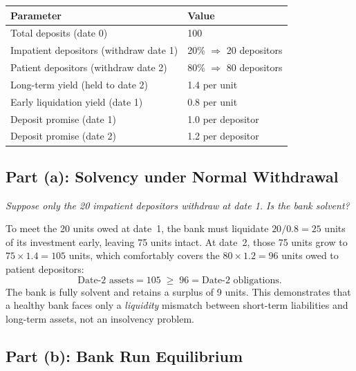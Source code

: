 \documentclass[a4paper]{article}
\begin{document}
\begin{center}
\begin{tabular}{ll}
\toprule
\textbf{Parameter} & \textbf{Value} \\
\midrule
Total deposits (date 0)              & 100 \\
Impatient depositors (withdraw date 1) & 20\% $\Rightarrow$ 20 depositors \\
Patient depositors (withdraw date 2)   & 80\% $\Rightarrow$ 80 depositors \\
Long-term yield (held to date 2)       & 1.4 per unit \\
Early liquidation yield (date 1)       & 0.8 per unit \\
Deposit promise (date 1)               & 1.0 per depositor \\
Deposit promise (date 2)               & 1.2 per depositor \\
\bottomrule
\end{tabular}
\end{center}

\subsection{Part (a): Solvency under Normal Withdrawal}

\textit{Suppose only the 20 impatient depositors withdraw at date 1. Is the
bank solvent?}

\medskip
To meet the 20 units owed at date~1, the bank must liquidate
\(20 / 0.8 = 25\) units of its investment early, leaving 75 units intact.
At date~2, those 75 units grow to \(75 \times 1.4 = 105\) units, which
comfortably covers the \(80 \times 1.2 = 96\) units owed to patient
depositors:
\[
\text{Date-2 assets} = 105 \;\geq\; 96 = \text{Date-2 obligations.}
\]
The bank is fully solvent and retains a surplus of 9 units. This
demonstrates that a healthy bank faces only a \emph{liquidity} mismatch
between short-term liabilities and long-term assets, not an insolvency
problem.

\subsection{Part (b): Bank Run Equilibrium}
\end{document}
